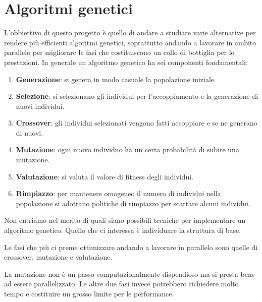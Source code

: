 \section{Algoritmi genetici}

L'obbiettivo di questo progetto è quello di andare a studiare varie alternative
per rendere più efficienti algoritmi genetici, soprattutto andando a lavorare
in ambito parallelo per migliorare le fasi che costituiscono un collo di
bottiglia per le prestazioni. In generale un algoritmo genetico ha sei
componenti fondamentali:
\begin{enumerate}
	\item \textbf{Generazione}: si genera in modo casuale la popolazione
	      iniziale.
	\item \textbf{Selezione}: si selezionano gli individui per l'accoppiamento
	      e la generazione di nuovi individui.
	\item \textbf{Crossover}: gli individui selezionati vengono fatti
	      accoppiare e se ne generano di nuovi.
	\item \textbf{Mutazione}: ogni nuovo individuo ha un certa probabilità di
	      subire una mutazione.
	\item \textbf{Valutazione}: si valuta il valore di fitness degli individui.
	\item \textbf{Rimpiazzo}: per mantenere omogeneo il numero di individui
	      nella popolazione si adottano politiche di rimpiazzo per scartare
	      alcuni individui.
\end{enumerate}
Non entriamo nel merito di quali siano possibili tecniche per implementare un
algoritmo genetico. Quello che ci interessa è individuare la struttura di base.

Le fasi che più ci preme ottimizzare andando a lavorare in parallelo sono
quelle di crossover, mutazione e valutazione.

La mutazione non è un passo computazionalmente dispendioso ma si presta bene ad
essere parallelizzato. Le altre due fasi invece potrebbero richiedere molto
tempo e costituire un grosso limite per le performance.